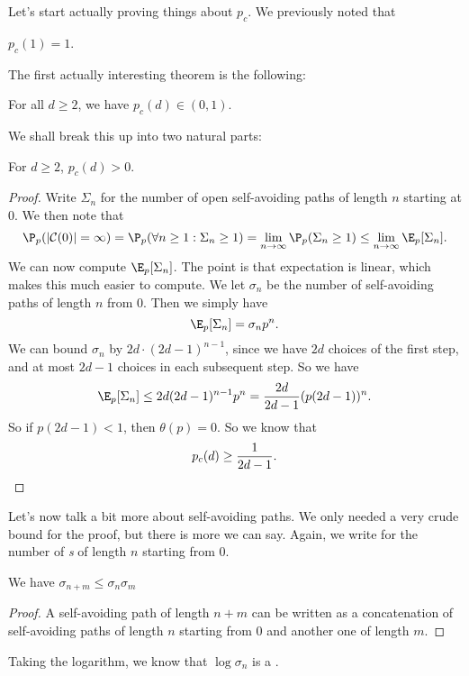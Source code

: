 \documentclass[a4paper]{article}
\begin{document}
Let's start actually proving things about $p_c$. We previously noted that
\begin{prop}
  $p_c(1) = 1$.
\end{prop}

The first actually interesting theorem is the following:
\begin{thm}
  For all $d \geq 2$, we have $p_c(d) \in (0, 1)$.
\end{thm}

We shall break this up into two natural parts:
\begin{lemma}
  For $d \geq 2$, $p_c(d) > 0$.
\end{lemma}

\begin{proof}
  Write $\Sigma_n$ for the number of open self-avoiding paths of length $n$ starting at $0$. We then note that
  \[
    \P_p(|\mathcal{C}(0)| = \infty) = \P_p(\forall n \geq 1: \Sigma_n \geq 1) = \lim_{n \to \infty} \P_p(\Sigma_n \geq 1) \leq \lim_{n \to \infty} \E_p[\Sigma_n].
  \]
  We can now compute $\E_p[\Sigma_n]$. The point is that expectation is linear, which makes this much easier to compute. We let $\sigma_n$ be the number of self-avoiding paths of length $n$ from $0$. Then we simply have
  \[
    \E_p[\Sigma_n] = \sigma_n p^n.
  \]
  We can bound $\sigma_n$ by $2d \cdot (2d - 1)^{n - 1}$, since we have $2d$ choices of the first step, and at most $2d - 1$ choices in each subsequent step. So we have
  \[
    \E_p[\Sigma_n] \leq 2d (2d - 1)^{n - 1} p^n = \frac{2d}{2d - 1} (p(2d - 1))^n.
  \]
  So if $p (2d - 1) < 1$, then $\theta(p) = 0$. So we know that
  \[
    p_c(d) \geq \frac{1}{2d - 1}.\qedhere
  \]
\end{proof}

Let's now talk a bit more about self-avoiding paths. We only needed a very crude bound for the proof, but there is more we can say. Again, we write  for the number of \emph{s} of length $n$ starting from $0$.

\begin{lemma}
  We have $\sigma_{n + m} \leq \sigma_n \sigma_m$
\end{lemma}

\begin{proof}
  A self-avoiding path of length $n + m$ can be written as a concatenation of self-avoiding paths of length $n$ starting from $0$ and another one of length $m$.
\end{proof}
Taking the logarithm, we know that $\log \sigma_n$ is a .
\end{document}
